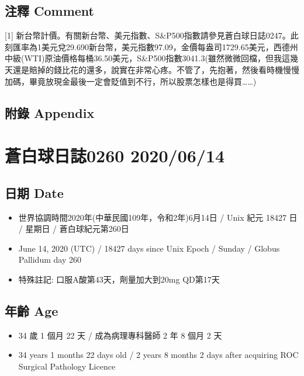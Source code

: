 \documentclass[a5paper, 11pt
]{book}
\providecommand{\tightlist}{%
  \setlength{\itemsep}{0pt}\setlength{\parskip}{0pt}}
\begin{document}
\hypertarget{ux6ce8ux91cb-comment-12}{%
\subsection{注釋 Comment}\label{ux6ce8ux91cb-comment-12}}

{[}1{]}
新台幣計價。有關新台幣、美元指數、S\&P500指數請參見蒼白球日誌0247。此刻匯率為1美元兌29.690新台幣，美元指數97.09，金價每盎司1729.65美元，西德州中級(WTI)原油價格每桶36.50美元，S\&P500指數3041.3(雖然微微回檔，但我這幾天還是賠掉的錢比花的還多，說實在非常心疼。不管了，先抱著，然後看時機慢慢加碼，畢竟放現金最後一定會貶值到不行，所以股票怎樣也是得買\ldots\ldots)

\hypertarget{ux9644ux9304-appendix-12}{%
\subsection{附錄 Appendix}\label{ux9644ux9304-appendix-12}}

\hypertarget{ux84bcux767dux7403ux65e5ux8a8c0260-20200614}{%
\section{蒼白球日誌0260
2020/06/14}\label{ux84bcux767dux7403ux65e5ux8a8c0260-20200614}}

\hypertarget{ux65e5ux671f-date-13}{%
\subsection{日期 Date}\label{ux65e5ux671f-date-13}}

\begin{itemize}
\tightlist
\item
  世界協調時間2020年(中華民國109年，令和2年)6月14日 / Unix 紀元 18427 日
  / 星期日 / 蒼白球紀元第260日
\item
  June 14, 2020 (UTC) / 18427 days since Unix Epoch / Sunday / Globus
  Pallidum day 260
\item
  特殊註記: 口服A酸第43天，劑量加大到20mg QD第17天
\end{itemize}

\hypertarget{ux5e74ux9f61-age-13}{%
\subsection{年齡 Age}\label{ux5e74ux9f61-age-13}}

\begin{itemize}
\tightlist
\item
  34 歲 1 個月 22 天 / 成為病理專科醫師 2 年 8 個月 2 天
\item
  34 years 1 months 22 days old / 2 years 8 months 2 days after
  acquiring ROC Surgical Pathology Licence
\end{itemize}
\end{document}

